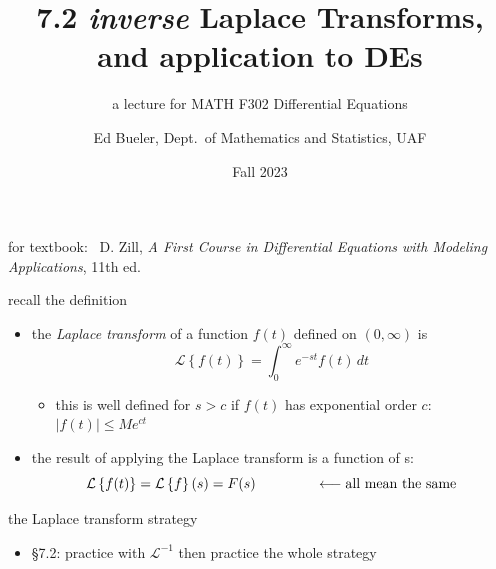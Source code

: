 \documentclass[dvipsnames,colorlinks]{beamer}
\title{7.2 \emph{inverse} Laplace Transforms, \\ and application to DEs}
\subtitle{a lecture for MATH F302 Differential Equations}
\author{Ed Bueler, Dept.~of Mathematics and Statistics, UAF}
\date{Fall 2023}
\begin{document}


\begin{frame}
\titlepage

\centerline{\tiny for textbook: \, D. Zill, \emph{A First Course in Differential Equations with Modeling Applications}, 11th ed.}
\end{frame}


\newcommand{\LL}[1]{\mathcal{L}\left\{#1\right\}}
\newcommand{\LLi}[1]{\mathcal{L}^{-1}\left\{#1\right\}}

\begin{frame}{recall the definition}

\begin{itemize}
\item the \emph{Laplace transform} of a function $f(t)$ defined on $(0,\infty)$ is
    $$\LL{f(t)} = \int_0^\infty e^{-st} f(t)\,dt$$
    \begin{itemize}
    \item this is well defined for $s>c$ if $f(t)$ has exponential order $c$:  $|f(t)| \le M e^{ct}$
    \end{itemize}

\bigskip
\item the result of applying the Laplace transform is a function of s:
    $$\LL{f(t)} = \LL{f}(s) = F(s) \hspace{15mm} \longleftarrow \text{all mean the same}$$
\end{itemize}
\end{frame}


\begin{frame}{the Laplace transform strategy}

\begin{center}
\end{center}

\vspace{10mm}
\begin{itemize}
\item \S 7.2: practice with $\mathcal{L}^{-1}$ then practice the whole strategy
\end{itemize}
\end{frame}
\end{document}
